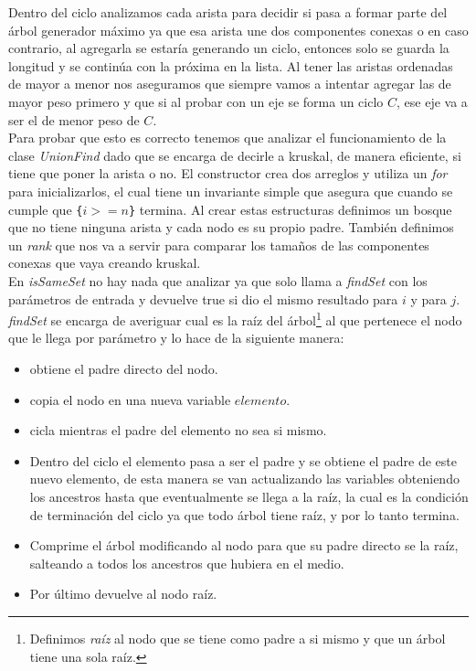 Dentro del ciclo analizamos cada arista para decidir si pasa a formar parte del árbol generador máximo ya que esa arista une dos componentes conexas o en caso contrario, al agregarla se estaría generando un ciclo, entonces solo se guarda la longitud y se continúa con la próxima en la lista. Al tener las aristas ordenadas de mayor a menor nos aseguramos que siempre vamos a intentar agregar las de mayor peso primero y que si al probar con un eje se forma un ciclo $C$, ese eje va a ser el de menor peso de $C$.\\

Para probar que esto es correcto tenemos que analizar el funcionamiento de la clase \textit{UnionFind} dado que se encarga de decirle a kruskal, de manera eficiente, si tiene que poner la arista o no. El constructor crea dos arreglos y utiliza un \emph{for} para inicializarlos, el cual tiene un invariante simple que asegura que cuando se cumple que \texttt{\{$i >= n$\}} termina. Al crear estas estructuras definimos un bosque que no tiene ninguna arista y cada nodo es su propio padre. También definimos un \emph{rank} que nos va a servir para comparar los tamaños de las componentes conexas que vaya creando kruskal.\\

En \textit{isSameSet} no hay nada que analizar ya que solo llama a \textit{findSet} con los parámetros de entrada y devuelve true si dio el mismo resultado para $i$ y para $j$. \textit{findSet} se encarga de averiguar cual es la raíz del árbol\footnote{Definimos \emph{raíz} al nodo que se tiene como padre a si mismo y que un árbol tiene una sola raíz.} al que pertenece el nodo que le llega por parámetro y lo hace de la siguiente manera:
\begin{itemize}
	\item obtiene el padre directo del nodo.
	\item copia el nodo en una nueva variable $elemento$.
	\item cicla mientras el padre del elemento no sea si mismo.
	\item Dentro del ciclo el elemento pasa a ser el padre y se obtiene el padre de este nuevo elemento, de esta manera se van actualizando las variables obteniendo los ancestros hasta que eventualmente se llega a la raíz, la cual es la condición de terminación del ciclo ya que todo árbol tiene raíz, y por lo tanto termina.
	\item Comprime el árbol modificando al nodo para que su padre directo se la raíz, salteando a todos los ancestros que hubiera en el medio.
	\item Por último devuelve al nodo raíz.
\end{itemize}

